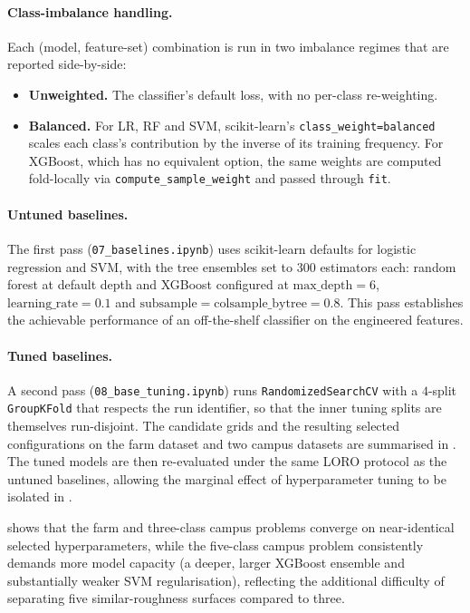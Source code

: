 \paragraph{Class-imbalance handling.}
Each (model, feature-set) combination is run in two imbalance regimes that are reported side-by-side:
\begin{itemize}
    \item \textbf{Unweighted.} The classifier's default loss, with no per-class re-weighting.
    \item \textbf{Balanced.} For LR, RF and SVM, scikit-learn's \texttt{class\_weight=\textquotesingle balanced\textquotesingle} scales each class's contribution by the inverse of its training frequency. For XGBoost, which has no equivalent option, the same weights are computed fold-locally via \texttt{compute\_sample\_weight} and passed through \texttt{fit}.
\end{itemize}

\paragraph{Untuned baselines.}
The first pass (\texttt{07\_baselines.ipynb}) uses scikit-learn defaults for logistic regression and SVM, with the tree ensembles set to 300 estimators each: random forest at default depth and XGBoost configured at $\mathrm{max\_depth}=6$, $\mathrm{learning\_rate}=0.1$ and $\mathrm{subsample}=\mathrm{colsample\_bytree}=0.8$. This pass establishes the achievable performance of an off-the-shelf classifier on the engineered features.

\paragraph{Tuned baselines.}
A second pass (\texttt{08\_base\_tuning.ipynb}) runs \texttt{RandomizedSearchCV} with a $4$-split \texttt{GroupKFold} that respects the run identifier, so that the inner tuning splits are themselves run-disjoint. The candidate grids and the resulting selected configurations on the farm dataset and two campus datasets are summarised in . The tuned models are then re-evaluated under the same LORO protocol as the untuned baselines, allowing the marginal effect of hyperparameter tuning to be isolated in .

 shows that the farm and three-class campus problems converge on near-identical selected hyperparameters, while the five-class campus problem consistently demands more model capacity (a deeper, larger XGBoost ensemble and substantially weaker SVM regularisation), reflecting the additional difficulty of separating five similar-roughness surfaces compared to three.

